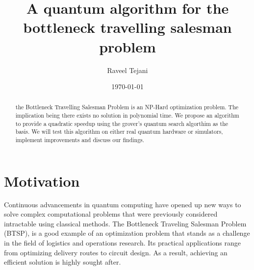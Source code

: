 \documentclass[twocolumn,showpacs,preprintnumbers,amsmath,amssymb]{revtex4}
\begin{document}
		
		\title{A quantum algorithm for the bottleneck travelling salesman problem}
		
		\author{Raveel Tejani}
		
		\date{\today}
		
		\begin{abstract}
			
			the Bottleneck Travelling Salesman Problem is an NP-Hard optimization problem. The implication being
			there exists no solution in polynomial time.  We propose an algorithm to provide a 
			quadratic speedup using the grover's quantum search algorthim as the basis. We will test this algorithm on either
			real quantum hardware or simulators, implement improvements and discuss our findings.
			
		\end{abstract}
		
		\maketitle
		
		
		\section{Motivation}
		
		
		Continuous advancements in quantum computing have opened up new ways to solve complex computational problems that were previously considered intractable using classical methods. The Bottleneck Traveling Salesman Problem (BTSP), is a good example of an optimization problem that stands as a challenge in the field of logistics and operations research. Its practical applications range from optimizing delivery routes to circuit design. As a result, achieving an efficient solution is highly sought after.
		
\end{document}
